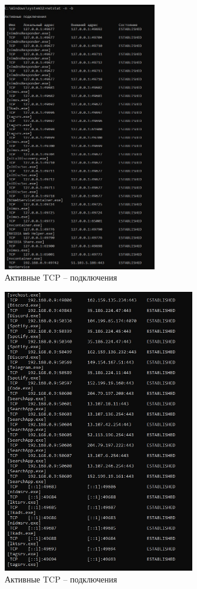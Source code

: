 \documentclass[bachelor, och, labwork]{shiza}
\begin{document}
\begin{enumerate}
    \begin{figure}[H]
        \centering      %
        \includegraphics[width=0.6\textwidth]{10}
        \caption{Активные TCP – подключения}
        \label{fig:image1}
    \end{figure}

    \begin{figure}[H]
        \centering      %
        \includegraphics[width=0.75\textwidth]{11}
        \caption{Активные TCP – подключения}
        \label{fig:image1}
    \end{figure}


\end{enumerate}
\end{document}
